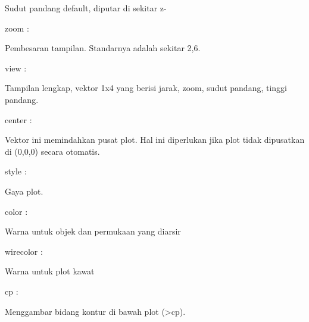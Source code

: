 \documentclass{article}
\begin{document}
\begin{eulernotebook}
\begin{eulercomment}
\begin{eulercomment}
\begin{eulercomment}
\begin{eulercomment}
\begin{eulercomment}
\begin{eulercomment}
\begin{eulerttcomment}
  Sudut pandang default, diputar di sekitar z-
\end{eulerttcomment}
\begin{eulercomment}
zoom :\\
\end{eulercomment}
\begin{eulerttcomment}
  Pembesaran tampilan. Standarnya adalah sekitar 2,6.
\end{eulerttcomment}
\begin{eulercomment}
view :\\
\end{eulercomment}
\begin{eulerttcomment}
  Tampilan lengkap, vektor 1x4 yang berisi jarak, zoom, sudut pandang,
  tinggi pandang.
\end{eulerttcomment}
\begin{eulercomment}
center :\\
\end{eulercomment}
\begin{eulerttcomment}
  Vektor ini memindahkan pusat plot. Hal ini diperlukan jika plot
  tidak dipusatkan di (0,0,0) secara otomatis.
\end{eulerttcomment}
\begin{eulercomment}
style :\\
\end{eulercomment}
\begin{eulerttcomment}
  Gaya plot.
\end{eulerttcomment}
\begin{eulercomment}
color :\\
\end{eulercomment}
\begin{eulerttcomment}
  Warna untuk objek dan permukaan yang diarsir
\end{eulerttcomment}
\begin{eulercomment}
wirecolor :\\
\end{eulercomment}
\begin{eulerttcomment}
  Warna untuk plot kawat
\end{eulerttcomment}
\begin{eulercomment}
cp :\\
\end{eulercomment}
\begin{eulerttcomment}
  Menggambar bidang kontur di bawah plot (>cp).
\end{eulerttcomment}
\begin{eulercomment}

\end{eulercomment}
\end{eulercomment}
\end{eulercomment}
\end{eulercomment}
\end{eulercomment}
\end{eulercomment}
\end{eulercomment}
\end{eulernotebook}
\end{document}
